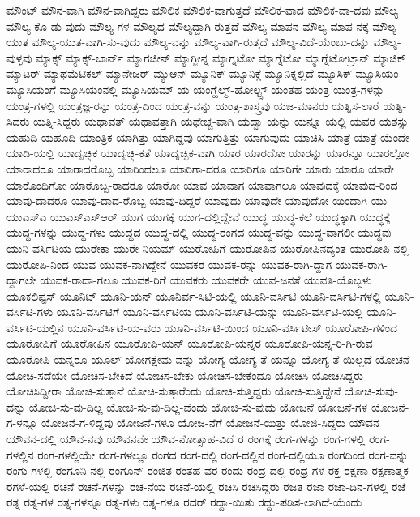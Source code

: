 {ಮೌಂಟ್
ಮೌನ-ವಾಗಿ
ಮೌನ-ವಾಗಿದ್ದರು
ಮೌಲಿಕ
ಮೌಲಿಕ-ವಾಗುತ್ತದೆ
ಮೌಲಿಕ-ವಾದ
ಮೌಲಿಕ-ವಾ-ದವು
ಮೌಲ್ಯ
ಮೌಲ್ಯ-ಕೊ-ಡು-ವುದು
ಮೌಲ್ಯ-ಗಳ
ಮೌಲ್ಯದ
ಮೌಲ್ಯದ್ದಾಗಿ-ರುತ್ತದೆ
ಮೌಲ್ಯ-ಮಾಪನ
ಮೌಲ್ಯ-ಮಾಪ-ನಕ್ಕೆ
ಮೌಲ್ಯ-ಯುತ
ಮೌಲ್ಯ-ಯುತ-ವಾಗಿ-ಸು-ವುದು
ಮೌಲ್ಯ-ವನ್ನು
ಮೌಲ್ಯ-ವಾಗಿ-ರುತ್ತದೆ
ಮೌಲ್ಯ-ವಿದೆ-ಯೆಂಬು-ದನ್ನು
ಮೌಲ್ಯ-ವುಳ್ಳವು
ಮ್ಯಾಕ್ಸ್
ಮ್ಯಾಕ್ಸ್-ಬಾರ್ನ್
ಮ್ಯಾಗಜೀನ್
ಮ್ಯಾಗ್ಜೀನ್ನ
ಮ್ಯಾಗ್ನಟೋ
ಮ್ಯಾಗ್ನೆಟೋ
ಮ್ಯಾಗ್ನೆಟೋಟ್ರಾನ್
ಮ್ಯಾಜಿಕ್
ಮ್ಯಾಟರ್
ಮ್ಯಾಥಮೆಟಿಕಲ್
ಮ್ಯಾನೇಜರ್
ಮ್ಯುಆನ್
ಮ್ಯೂನಿಕ್
ಮ್ಯೂನಿಕ್ಗೆ
ಮ್ಯೂನಿಕ್ನಲ್ಲಿದೆ
ಮ್ಯೂಸಿಕ್
ಮ್ಯೂಸಿಯಂ
ಮ್ಯೂಸಿಯಂಗೆ
ಮ್ಯೂಸಿಯಂನಲ್ಲಿ
ಮ್ಯೂಸಿಯಮ್
ಯ
ಯಂಗ್ಹೆಲ್ಮ್-ಹೋಲ್ಟ್ಸ್
ಯಂತಹ
ಯಂತ್ರ
ಯಂತ್ರ-ಗಳನ್ನು
ಯಂತ್ರ-ಗಳಲ್ಲಿ
ಯಂತ್ರಜ್ಞ-ರನ್ನು
ಯಂತ್ರ-ದಿಂದ
ಯಂತ್ರ-ವನ್ನು
ಯಂತ್ರ-ಶಾಸ್ತ್ರವು
ಯಜ-ಮಾನರು
ಯತ್ನಿಸ-ಲಾರೆ
ಯತ್ನಿ-ಸಿದರು
ಯತ್ನಿ-ಸಿದ್ದರು
ಯಥಾವತ್
ಯಥಾವತ್ತಾಗಿ
ಯಥೇಚ್ಚ-ವಾಗಿ
ಯದ್ವಾ
ಯನ್ನು
ಯನ್ನೂ
ಯಲ್ಲಿ
ಯವರ
ಯಶಸ್ಸು
ಯಹುದಿ
ಯಹೂದಿ
ಯಾಂತ್ರಿಕ
ಯಾಗಿತ್ತು
ಯಾಗಿದ್ದವು
ಯಾಗುತ್ತಿತ್ತು
ಯಾಗುವುದು
ಯಾಚಿಸಿ
ಯಾತ್ರೆ
ಯಾತ್ರೆ-ಯೆಂದೇ
ಯಾದಿ-ಯಲ್ಲಿ
ಯಾದೃಚ್ಛಿಕ
ಯಾದೃಚ್ಛಿ-ಕತೆ
ಯಾದೃಚ್ಛಿಕ-ವಾಗಿ
ಯಾರ
ಯಾರದೋ
ಯಾರನ್ನು
ಯಾರನ್ನೂ
ಯಾರಲ್ಲೋ
ಯಾರಾದರೂ
ಯಾರಾದರೊಬ್ಬ
ಯಾರಿಂದಲೂ
ಯಾರಿಗಾ-ದರೂ
ಯಾರಿಗೂ
ಯಾರಿಗೇ
ಯಾರು
ಯಾರೂ
ಯಾರೇ
ಯಾರೊಂದಿಗೋ
ಯಾರೊಬ್ಬ-ರಾದರೂ
ಯಾರೋ
ಯಾವ
ಯಾವಾಗ
ಯಾವಾಗಲೂ
ಯಾವುದಕ್ಕೆ
ಯಾವುದ-ರಿಂದ
ಯಾವು-ದಾದರೂ
ಯಾವು-ದಾದ-ರೊಬ್ಬ
ಯಾವು-ದಿದ್ದರೆ
ಯಾವುದು
ಯಾವುದೇ
ಯಾವುದೋ
ಯಿಂದಾಗಿ
ಯು
ಯುಎಸ್ಎ
ಯುಎಸ್ಎಸ್ಆರ್
ಯುಗ
ಯುಗಕ್ಕೆ
ಯುಗ-ದಲ್ಲಿದ್ದೇವೆ
ಯುದ್ಧ
ಯುದ್ಧ-ಕಲೆ
ಯುದ್ಧಕ್ಕಾಗಿ
ಯುದ್ಧಕ್ಕೆ
ಯುದ್ಧ-ಗಳನ್ನು
ಯುದ್ಧ-ಗಳು
ಯುದ್ಧದ
ಯುದ್ಧ-ದಲ್ಲಿ
ಯುದ್ಧ-ರಂಗದ
ಯುದ್ಧ-ವನ್ನು
ಯುದ್ಧ-ವಾಗಲೀ
ಯುದ್ಧವು
ಯುನಿ-ವರ್ಸಿಟಿಯ
ಯುರೇಕಾ
ಯುರೇ-ನಿಯಮ್
ಯುರೋಪಿಗೆ
ಯುರೋಪಿನ
ಯುರೋಪಿನದ್ಯಂತ
ಯುರೋಪಿ-ನಲ್ಲಿ
ಯುರೋಪಿ-ನಿಂದ
ಯುವ
ಯುವಕ-ನಾಗಿದ್ದೇನೆ
ಯುವಕರ
ಯುವಕ-ರನ್ನು
ಯುವಕ-ರಾಗಿ-ದ್ದಾಗ
ಯುವಕ-ರಾಗಿ-ದ್ದಾಗಲೇ
ಯುವಕ-ರಾದಾ-ಗಲೂ
ಯುವಕ-ರಿಗೆ
ಯುವಕರು
ಯುವಕರೇ
ಯುವ-ಜನತೆ
ಯುವತಿ-ಯೊಬ್ಬಳು
ಯೂಕಲಿಪ್ಟಸ್
ಯೂನಿಟ್
ಯೂನಿ-ಯನ್
ಯೂನಿರ್ವ-ಸಿಟಿ-ಯಲ್ಲಿ
ಯೂನಿ-ವರ್ಸಿಟಿ
ಯೂನಿ-ವರ್ಸಿಟಿ-ಗಳಲ್ಲಿ
ಯೂನಿ-ವರ್ಸಿಟಿ-ಗಳು
ಯೂನಿ-ವರ್ಸಿಟಿಗೆ
ಯೂನಿ-ವರ್ಸಿಟಿಯ
ಯೂನಿ-ವರ್ಸಿಟಿ-ಯನ್ನು
ಯೂನಿ-ವರ್ಸಿಟಿ-ಯಲ್ಲಿ
ಯೂನಿ-ವರ್ಸಿಟಿ-ಯಲ್ಲಿನ
ಯೂನಿ-ವರ್ಸಿಟಿ-ಯ-ವರು
ಯೂನಿ-ವರ್ಸಿಟಿ-ಯಿಂದ
ಯೂನಿ-ವರ್ಸಿಟೀಸ್
ಯೂರೋಪಿ-ಗಳಿಂದ
ಯೂರೋಪಿಗೆ
ಯೂರೋಪಿನ
ಯೂರೋಪಿ-ಯನ್
ಯೂರೋಪಿ-ಯನ್ನರ
ಯೂರೋಪಿ-ಯನ್ನ-ರಿ-ಗಿ-ರುವ
ಯೂರೋಪಿ-ಯನ್ನರೂ
ಯೂಲ್
ಯೋಗಕ್ಷೇಮ-ವನ್ನು
ಯೋಗ್ಯ
ಯೋಗ್ಯ-ತೆ-ಯನ್ನೂ
ಯೋಗ್ಯ-ತೆ-ಯಿಲ್ಲದೆ
ಯೋಚನೆ
ಯೋಚಿ-ಸದೆಯೇ
ಯೋಚಿಸ-ಬೇಕಿದೆ
ಯೋಚಿಸ-ಬೇಕು
ಯೋಚಿಸ-ಬೇಕೆಂದೂ
ಯೋಚಿಸಿ
ಯೋಚಿಸಿದ್ದರು
ಯೋಚಿಸಿದ್ದೀರಾ
ಯೋಚಿ-ಸುತ್ತಾನೆ
ಯೋಚಿ-ಸುತ್ತಾರೆಂದು
ಯೋಚಿ-ಸುತ್ತಿದ್ದರು
ಯೋಚಿ-ಸುತ್ತಿದ್ದೇನೆ
ಯೋಚಿ-ಸುವು-ದನ್ನು
ಯೋಚಿ-ಸು-ವು-ದಿಲ್ಲ
ಯೋಚಿ-ಸು-ವು-ದಿಲ್ಲ-ವೆಂದು
ಯೋಚಿ-ಸು-ವುದು
ಯೋಜನೆ
ಯೋಜನೆ-ಗಳ
ಯೋಜನೆ-ಗ-ಳನ್ನೂ
ಯೋಜನೆ-ಗ-ಳಿದ್ದವು
ಯೋಜನೆ-ಗಳೂ
ಯೋಜ-ನೆಗೆ
ಯೋಜನೆ-ಯಿತ್ತು
ಯೋಜಿ-ಸಿದ್ದರು
ಯೌವನ
ಯೌವನ-ದಲ್ಲಿ
ಯೌವ-ನವು
ಯೌವನವೇ
ಯೌವ-ನೋತ್ಸಾಹ-ವಿದೆ
ರ
ರಂಗಕ್ಕೆ
ರಂಗ-ಗಳನ್ನು
ರಂಗ-ಗಳಲ್ಲಿ
ರಂಗ-ಗಳಲ್ಲಿನ
ರಂಗ-ಗಳಲ್ಲಿಯೇ
ರಂಗ-ಗಳಲ್ಲೂ
ರಂಗದ
ರಂಗ-ದಲ್ಲಿ
ರಂಗ-ದಲ್ಲಿನ
ರಂಗ-ದಲ್ಲಿಯೂ
ರಂಗದಿಂದ
ರಂಗ-ವನ್ನು
ರಂಗು-ಗಳಲ್ಲಿ
ರಂಗೂನಿ-ನಲ್ಲಿ
ರಂಗೂನ್
ರಂಜಿತ
ರಂತಹ-ವರ
ರಂದು
ರಂದ್ರ-ದಲ್ಲಿ
ರಂಧ್ರ-ಗಳ
ರಕ್ತ
ರಕ್ಷಣಾ
ರಕ್ಷಣಾತ್ಮಕ
ರಗಳೆ-ಯಲ್ಲಿ
ರಚನೆ
ರಚನೆ-ಗಳನ್ನು
ರಚ-ನೆಯ
ರಚನೆ-ಯಲ್ಲಿ
ರಚಿಸಿ
ರಚಿಸಿದ್ದರು
ರಜತ
ರಜಾ
ರಜಾ-ದಿನ-ಗಳಲ್ಲಿ
ರಜೆ
ರತ್ನ
ರತ್ನ-ಗಳ
ರತ್ನ-ಗಳನ್ನೂ
ರತ್ನ-ಗಳು
ರತ್ನ-ಗಳೂ
ರದರ್
ರದ್ದಾ-ಯಿತು
ರದ್ದು-ಪಡಿಸ-ಲಾಗಿದೆ-ಯೆಂದು
}
